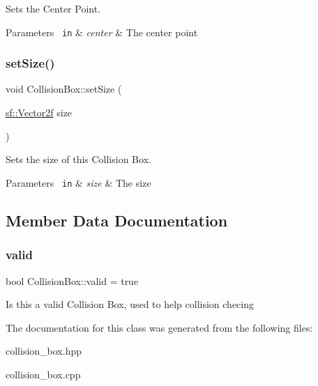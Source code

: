 Sets the Center Point. 


\begin{DoxyParams}[1]{Parameters}
\mbox{\texttt{ in}}  & {\em center} & The center point \\
\hline
\end{DoxyParams}
\mbox{\label{class_collision_box_a69648de73a107cdac3b46d6aa0c833b0}} 
\subsubsection{\texorpdfstring{setSize()}{setSize()}}
{\footnotesize\ttfamily void Collision\+Box\+::set\+Size (\begin{DoxyParamCaption}\item[{\mbox{\hyperlink{classsf_1_1_vector2}{sf\+::\+Vector2f}}}]{size }\end{DoxyParamCaption})}



Sets the size of this Collision Box. 


\begin{DoxyParams}[1]{Parameters}
\mbox{\texttt{ in}}  & {\em size} & The size \\
\hline
\end{DoxyParams}


\subsection{Member Data Documentation}
\mbox{\label{class_collision_box_ad1c8e359ccf41748322ee753a4fe4642}} 
\subsubsection{\texorpdfstring{valid}{valid}}
{\footnotesize\ttfamily bool Collision\+Box\+::valid = true\hspace{0.3cm}{\ttfamily [private]}}

Is this a valid Collision Box, used to help collision checing 

The documentation for this class was generated from the following files\+:\begin{DoxyCompactItemize}
\item 
collision\+\_\+box.\+hpp\item 
collision\+\_\+box.\+cpp\end{DoxyCompactItemize}
